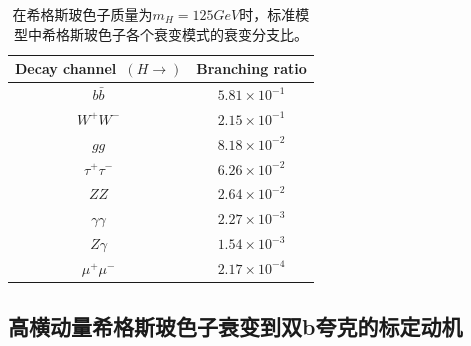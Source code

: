 \begin{table}[htbp]
      \caption{在希格斯玻色子质量为$m_H=125GeV$时，标准模型中希格斯玻色子各个衰变模式的衰变分支比。}
      \label{tab:SMTab1}
      \centering
      
      \begin{tabular}{|c|c|}
      \hline
      Decay channel~$(H \rightarrow )$ & Branching ratio \\
       \hline
        $b \bar{b}$ & $5.81\times 10^{-1}$   \\
         \hline
        $W^+W^-$ &  $2.15\times 10^{-1}$ \\
         \hline
        $gg$  &  $8.18\times 10^{-2}$  \\
         \hline
        $\tau^+\tau^-$  &  $6.26\times 10^{-2}$  \\
         \hline
        $ZZ$  & $2.64\times 10^{-2}$  \\
         \hline
        $\gamma\gamma$  & $2.27\times 10^{-3}$   \\
         \hline
        $Z\gamma $ & $1.54\times 10^{-3}$  \\
         \hline
        $\mu^+\mu^-$ & $2.17\times 10^{-4}$  \\
        \hline 
      \end{tabular}
\end{table}


\subsection{高横动量希格斯玻色子衰变到双b夸克的标定动机}
\label{sec:BoostedHiggs}


